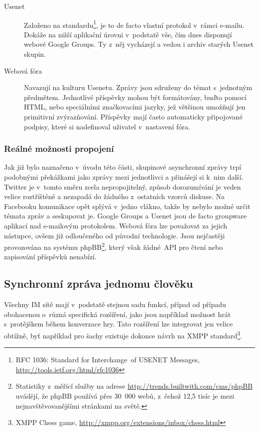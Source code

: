 \documentclass[12pt,oneside,final]{fithesis2}
\begin{document}
\begin{description}
    \item[Usenet]
        Založeno na standardu\footnote{RFC 1036: Standard for Interchange~of USENET Messages, \url{http://tools.ietf.org/html/rfc1036}}, je to de facto vlastní protokol v~rámci e-mailu. Dokáže na nižší aplikační úrovni v~podstatě vše, čím dnes disponují webové Google Groups. Ty z~něj vycházejí a vedou i archiv starých Usenet skupin.

    \item[Webová fóra]
        Navazují na kulturu Usenetu. Zprávy jsou sdruženy do témat s~jednotným předmětem. Jednotlivé příspěvky mohou být formátovány, buďto pomocí HTML, nebo speciálními značkovacími jazyky, jež většinou umožňují jen primitivní zvýrazňování. Příspěvky mají často automaticky připojované podpisy, které si nadefinoval uživatel v~nastavení fóra.
\end{description}

\subsubsection*{Reálné možnosti propojení}
Jak již bylo naznačeno v~úvodu této části, skupinové asynchronní zprávy trpí podobnými překážkami jako zprávy mezi jednotlivci a přinášejí si k~nim další. Twitter je v~tomto směru zcela nepropojitelný, způsob dorozumívání je veden velice roztříštěně a nezapadá do žádného z~ostatních vzorců diskuse. Na Facebooku komunikace opět splývá v~jedno vlákno, takže by nebylo možné určit témata zpráv a seskupovat je. Google Groups a Usenet jsou de facto groupware aplikací nad e-mailovým protokolem. Webová fóra lze považovat za jejich nástupce, ovšem již odloučeného od původní technologie. Jsou nejčastěji provozována na systému phpBB\footnote{Statistiky z~měřící služby na adrese \url{http://trends.builtwith.com/cms/phpBB} uvádějí, že phpBB používá přes 30~000 webů, z~čehož 12,5 tisíc je mezi nejnavštěvovanějšími stránkami na světě.}, který však žádné~API pro čtení nebo zapisování příspěvků nenabízí.

\subsection{Synchronní zpráva jednomu člověku}
Všechny IM sítě mají v~podstatě stejnou sadu funkcí, případ od případu obohacenou o~různá specifická rozšíření, jako jsou například možnost hrát s~protějškem během konverzace hry. Tato rozšíření lze integrovat jen velice obtížně, byť například pro šachy existuje dokonce návrh na XMPP standard\footnote{XMPP Chess game, \url{http://xmpp.org/extensions/inbox/chess.html}}.
\end{document}
